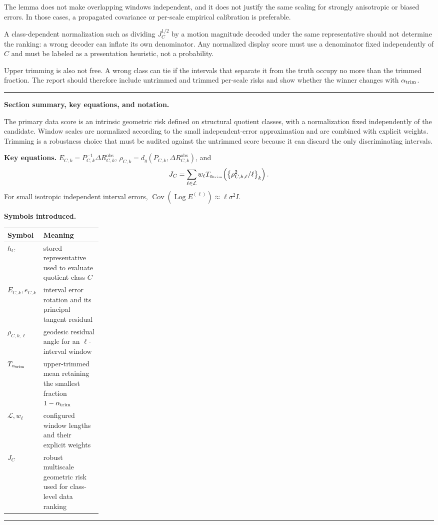 \documentclass[11pt]{article}
\newcommand{\Log}{\operatorname{Log}}
\newenvironment{sectionrecap}
{\par\medskip\begingroup\small\noindent\rule{\linewidth}{0.4pt}\par
\smallskip\noindent\textbf{Section summary, key equations, and notation.}\par\smallskip}
{\par\smallskip\noindent\rule{\linewidth}{0.4pt}\par\endgroup\medskip}
\begin{document}
    The lemma does not make overlapping windows independent, and it does not justify the
    same scaling for strongly anisotropic or biased errors. In those cases, a propagated
    covariance or per-scale empirical calibration is preferable.

    A class-dependent normalization such as dividing $J_C^{1/2}$ by a motion magnitude
    decoded under the same representative should not determine the ranking: a wrong decoder
    can inflate its own denominator. Any normalized display score must use a denominator
    fixed independently of $C$ and must be labeled as a presentation heuristic, not a
    probability.

    Upper trimming is also not free. A wrong class can tie if the intervals that separate it
    from the truth occupy no more than the trimmed fraction. The report should therefore
    include untrimmed and trimmed per-scale risks and show whether the winner changes with
    $\alpha_{\rm trim}$.

    \begin{sectionrecap}
        The primary data score is an intrinsic geometric risk defined on structural quotient
        classes, with a normalization fixed independently of the candidate. Window scales are
        normalized according to the small independent-error approximation and are combined with
        explicit weights. Trimming is a robustness choice that must be audited against the
        untrimmed score because it can discard the only discriminating intervals.

        \noindent\textbf{Key equations.}
        \(E_{C,k}=P_{C,k}^{-1}\Delta R_{C,k}^{\mathrm{obs}}\),
        \(\rho_{C,k}=d_g(P_{C,k},\Delta R_{C,k}^{\mathrm{obs}})\), and
        \[
            J_C=\sum_{\ell\in\mathcal L}w_\ell
            T_{\alpha_{\rm trim}}\!\left(\left\{\rho_{C,k,\ell}^2/\ell\right\}_k\right).
        \]
        For small isotropic independent interval errors,
        $\operatorname{Cov}(\Log E^{(\ell)})\approx\ell\sigma^2I$.

        \noindent\textbf{Symbols introduced.}
        \par\noindent\begin{tabularx}{\linewidth}{@{}p{0.22\linewidth}Y@{}}
\toprule
Symbol & Meaning \\
\midrule
$h_C$ & stored representative used to evaluate quotient class $C$ \\
$E_{C,k},e_{C,k}$ & interval error rotation and its principal tangent residual \\
$\rho_{C,k,\ell}$ & geodesic residual angle for an $\ell$-interval window \\
$T_{\alpha_{\rm trim}}$ & upper-trimmed mean retaining the smallest fraction $1-\alpha_{\rm trim}$ \\
$\mathcal L,w_\ell$ & configured window lengths and their explicit weights \\
$J_C$ & robust multiscale geometric risk used for class-level data ranking \\
\bottomrule
        \end{tabularx}
    \end{sectionrecap}
\end{document}

